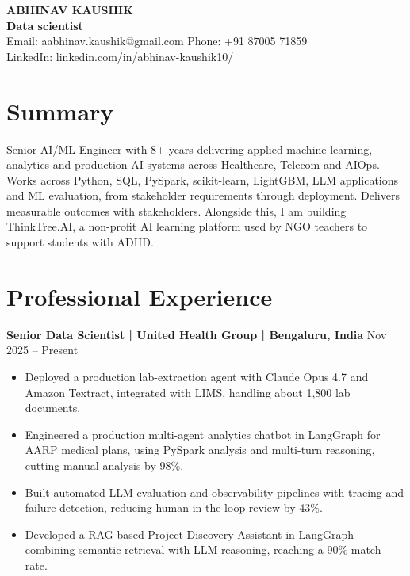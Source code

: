 \documentclass[10pt,a4paper]{article}
\newcommand{\role}[2]{\textbf{#1} \hfill #2\par}
\begin{document}
\begin{center}
  {\Large\bfseries ABHINAV KAUSHIK}\\[1pt]
  \textbf{Data scientist}\\[1pt]
  Email: aabhinav.kaushik@gmail.com \quad Phone: +91 87005 71859\\
  LinkedIn: linkedin.com/in/abhinav-kaushik10/
\end{center}

\section{Summary}
Senior AI/ML Engineer with 8+ years delivering applied machine learning, analytics and production AI systems across Healthcare, Telecom and AIOps. Works across Python, SQL, PySpark, scikit-learn, LightGBM, LLM applications and ML evaluation, from stakeholder requirements through deployment. Delivers measurable outcomes with stakeholders. Alongside this, I am building ThinkTree.AI, a non-profit AI learning platform used by NGO teachers to support students with ADHD.

\section{Professional Experience}
\role{Senior Data Scientist | United Health Group | Bengaluru, India}{Nov 2025 -- Present}
\begin{itemize}
  \item Deployed a production lab-extraction agent with Claude Opus 4.7 and Amazon Textract, integrated with LIMS, handling about 1,800 lab documents.
  \item Engineered a production multi-agent analytics chatbot in LangGraph for AARP medical plans, using PySpark analysis and multi-turn reasoning, cutting manual analysis by 98\%.
  \item Built automated LLM evaluation and observability pipelines with tracing and failure detection, reducing human-in-the-loop review by 43\%.
  \item Developed a RAG-based Project Discovery Assistant in LangGraph combining semantic retrieval with LLM reasoning, reaching a 90\% match rate.
\end{itemize}
\vspace{3pt}
\end{document}
